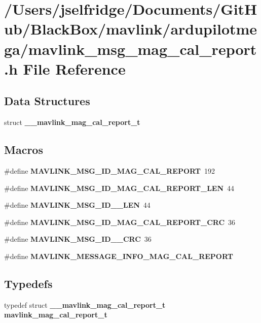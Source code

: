 \section{/\+Users/jselfridge/\+Documents/\+Git\+Hub/\+Black\+Box/mavlink/ardupilotmega/mavlink\+\_\+msg\+\_\+mag\+\_\+cal\+\_\+report.h File Reference}
\label{mavlink__msg__mag__cal__report_8h}
\subsection*{Data Structures}
\begin{DoxyCompactItemize}
\item 
struct \textbf{ \+\_\+\+\_\+mavlink\+\_\+mag\+\_\+cal\+\_\+report\+\_\+t}
\end{DoxyCompactItemize}
\subsection*{Macros}
\begin{DoxyCompactItemize}
\item 
\#define \textbf{ M\+A\+V\+L\+I\+N\+K\+\_\+\+M\+S\+G\+\_\+\+I\+D\+\_\+\+M\+A\+G\+\_\+\+C\+A\+L\+\_\+\+R\+E\+P\+O\+RT}~192
\item 
\#define \textbf{ M\+A\+V\+L\+I\+N\+K\+\_\+\+M\+S\+G\+\_\+\+I\+D\+\_\+\+M\+A\+G\+\_\+\+C\+A\+L\+\_\+\+R\+E\+P\+O\+R\+T\+\_\+\+L\+EN}~44
\item 
\#define \textbf{ M\+A\+V\+L\+I\+N\+K\+\_\+\+M\+S\+G\+\_\+\+I\+D\+\_\+\_\+\+L\+EN}~44
\item 
\#define \textbf{ M\+A\+V\+L\+I\+N\+K\+\_\+\+M\+S\+G\+\_\+\+I\+D\+\_\+\+M\+A\+G\+\_\+\+C\+A\+L\+\_\+\+R\+E\+P\+O\+R\+T\+\_\+\+C\+RC}~36
\item 
\#define \textbf{ M\+A\+V\+L\+I\+N\+K\+\_\+\+M\+S\+G\+\_\+\+I\+D\+\_\+\_\+\+C\+RC}~36
\item 
\#define \textbf{ M\+A\+V\+L\+I\+N\+K\+\_\+\+M\+E\+S\+S\+A\+G\+E\+\_\+\+I\+N\+F\+O\+\_\+\+M\+A\+G\+\_\+\+C\+A\+L\+\_\+\+R\+E\+P\+O\+RT}
\end{DoxyCompactItemize}
\subsection*{Typedefs}
\begin{DoxyCompactItemize}
\item 
typedef struct \textbf{ \+\_\+\+\_\+mavlink\+\_\+mag\+\_\+cal\+\_\+report\+\_\+t} \textbf{ mavlink\+\_\+mag\+\_\+cal\+\_\+report\+\_\+t}
\end{DoxyCompactItemize}


